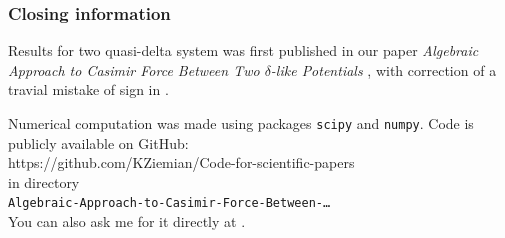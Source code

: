 \documentclass[10pt,t]{beamer}
\begin{document}
\begin{frame}
  \frametitle{Closing information}


  Results for two quasi-delta system was first published in our paper
  \textit{Algebraic Approach to Casimir Force Between Two $\delta$-like
    Potentials} \parencite{Ziemian-Algebraic-Approach-ETC-2021},
  with correction of a travial mistake of sign in
  \parencite{Ziemian-Correction-to-Algebraic-Approach-ETC-2023}.

  Numerical computation was made using packages \texttt{scipy} and
  \texttt{numpy}. Code is publicly available on GitHub: \\
  {https://github.com/KZiemian/Code-for-scientific-papers} \\
  in directory \\
  \texttt{Algebraic-Approach-to-Casimir-Force-Between-\ldots} \\
  You can also ask me for it directly at \email.

\end{frame}



\end{document}
